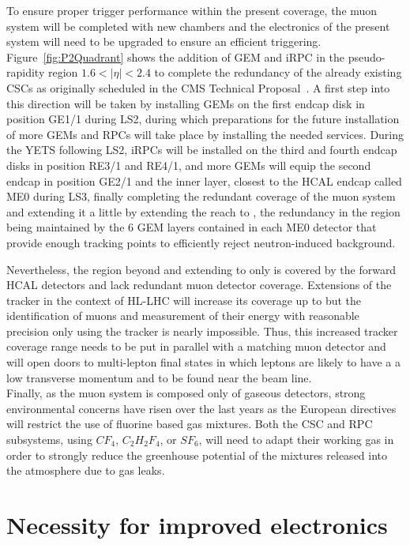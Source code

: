 To ensure proper trigger performance within the present coverage, the muon system will be completed with new chambers and the electronics of the present system will need to be upgraded to ensure an efficient triggering. Figure~\ref{fig:P2Quadrant} shows the addition of \acf{GEM} and \acf{iRPC} in the pseudo-rapidity region $1.6<\vert\eta\vert<2.4$ to complete the redundancy of the already existing CSCs as originally scheduled in the CMS Technical Proposal~\cite{CMSTP}. A first step into this direction will be taken by installing GEMs on the first endcap disk in position GE1/1 during LS2, during which preparations for the future installation of more GEMs and RPCs will take place by installing the needed services. During the YETS following LS2, iRPCs will be installed on the third and fourth endcap disks in position RE3/1 and RE4/1, and more GEMs will equip the second endcap in position GE2/1 and the inner layer, closest to the HCAL endcap called ME0 during LS3, finally completing the redundant coverage of the muon system and extending it a little by extending the reach to , the redundancy in the region  being maintained by the 6 GEM layers contained in each ME0 detector that provide enough tracking points to efficiently reject neutron-induced background.
	
	Nevertheless, the region beyond  and extending to  only is covered by the forward HCAL detectors and lack redundant muon detector coverage. Extensions of the tracker in the context of HL-LHC will increase its coverage up to  but the identification of muons and measurement of their energy with reasonable precision only using the tracker is nearly impossible. Thus, this increased tracker coverage range needs to be put in parallel with a matching muon detector and will open doors to multi-lepton final states in which leptons are likely to have a a low transverse momentum and to be found near the beam line.\\
	
	Finally, as the muon system is composed only of gaseous detectors, strong environmental concerns have risen over the last years as the European directives will restrict the use of fluorine based gas mixtures. Both the CSC and RPC subsystems, using $CF_4$, $C_2H_2F_4$, or $SF_6$, will need to adapt their working gas in order to strongly reduce the greenhouse potential of the mixtures released into the atmosphere due to gas leaks.
	
\section{Necessity for improved electronics}
\label{chapt3:sec:electronics}

